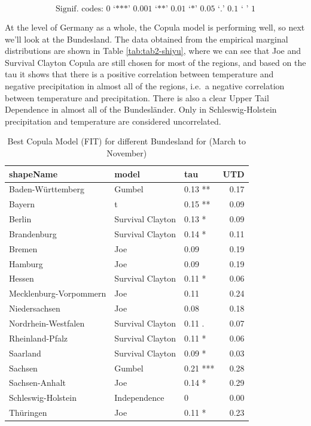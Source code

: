 \documentclass[
]{krantz}
\begin{document}
\[\text{Signif. codes: 0 ‘***’ 0.001 ‘**’ 0.01 ‘*’ 0.05 ‘.’ 0.1 ‘ ’ 1}\]

At the level of Germany as a whole, the Copula model is performing well, so next we'll look at the Bundesland. The data obtained from the empirical marginal distributions are shown in Table \ref{tab:tab2-shiyu}, where we can see that Joe and Survival Clayton Copula are still chosen for most of the regions, and based on the tau it shows that there is a positive correlation between temperature and negative precipitation in almost all of the regions, i.e.~a negative correlation between temperature and precipitation. There is also a clear Upper Tail Dependence in almost all of the Bundesländer. Only in Schleswig-Holstein precipitation and temperature are considered uncorrelated.

\begin{table}

\caption{\label{tab:tab3-shiyu}Best Copula Model (FIT) for different Bundesland for (March to November)}
\centering
\begin{tabular}[t]{l|l|l|r}
\hline
shapeName & model & tau & UTD\\
\hline
Baden-Württemberg & Gumbel & 0.13 ** & 0.17\\
\hline
Bayern & t & 0.15 ** & 0.09\\
\hline
Berlin & Survival Clayton & 0.13 * & 0.09\\
\hline
Brandenburg & Survival Clayton & 0.14 * & 0.11\\
\hline
Bremen & Joe & 0.09 & 0.19\\
\hline
Hamburg & Joe & 0.09 & 0.19\\
\hline
Hessen & Survival Clayton & 0.11 * & 0.06\\
\hline
Mecklenburg-Vorpommern & Joe & 0.11 & 0.24\\
\hline
Niedersachsen & Joe & 0.08 & 0.18\\
\hline
Nordrhein-Westfalen & Survival Clayton & 0.11 . & 0.07\\
\hline
Rheinland-Pfalz & Survival Clayton & 0.11 * & 0.06\\
\hline
Saarland & Survival Clayton & 0.09 * & 0.03\\
\hline
Sachsen & Gumbel & 0.21 *** & 0.28\\
\hline
Sachsen-Anhalt & Joe & 0.14 * & 0.29\\
\hline
Schleswig-Holstein & Independence & 0 & 0.00\\
\hline
Thüringen & Joe & 0.11 * & 0.23\\
\hline
\end{tabular}
\end{table}
\end{document}

